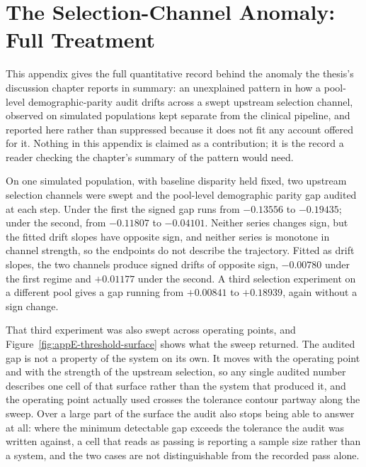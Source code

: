 \chapter{The Selection-Channel Anomaly: Full Treatment}
\label{app:anomaly}

This appendix gives the full quantitative record behind the anomaly the
thesis's discussion chapter reports in summary: an unexplained pattern in
how a pool-level demographic-parity audit drifts across a swept upstream
selection channel, observed on simulated populations kept separate from the
clinical pipeline, and reported here rather than suppressed because it does
not fit any account offered for it. Nothing in this appendix is claimed as a
contribution; it is the record a reader checking the chapter's summary of
the pattern would need.

On one simulated population, with baseline disparity held fixed, two
upstream selection channels were swept and the pool-level demographic parity
gap audited at each step. Under the first the signed gap runs from
$-0.13556$ to $-0.19435$; under the second, from $-0.11807$ to $-0.04101$.
Neither series changes sign, but the fitted drift slopes have opposite sign,
and neither series is monotone in channel strength, so the endpoints do not
describe the trajectory. Fitted as drift slopes, the two channels produce
signed drifts of opposite sign, $-0.00780$ under the first regime and
$+0.01177$ under the second. A third selection experiment on a different
pool gives a gap running from $+0.00841$ to $+0.18939$, again without a sign
change.

That third experiment was also swept across operating points, and
Figure~\ref{fig:appE-threshold-surface} shows what the sweep returned. The
audited gap is not a property of the system on its own. It moves with the
operating point and with the strength of the upstream selection, so any
single audited number describes one cell of that surface rather than the
system that produced it, and the operating point actually used crosses the
tolerance contour partway along the sweep. Over a large part of the surface
the audit also stops being able to answer at all: where the minimum
detectable gap exceeds the tolerance the audit was written against, a cell
that reads as passing is reporting a sample size rather than a system, and
the two cases are not distinguishable from the recorded pass alone.

